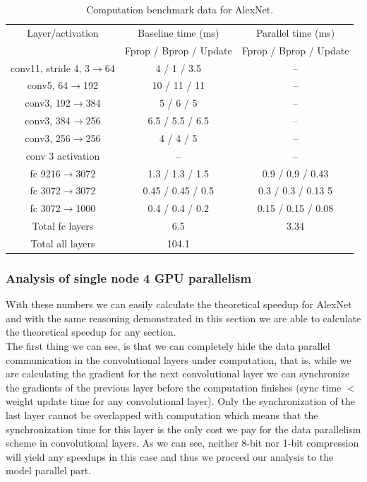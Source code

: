 \documentclass{article} %
\begin{document}
\begin{table}[h]
	\caption{Computation benchmark data for AlexNet. }
	\label{sample-table}
	\begin{minipage}
		{\linewidth}
		\centering
		\begin{tabular}{ ccc}
			\toprule[1.5pt]
			Layer/activation & Baseline time (ms) & Parallel time (ms)   \\
			& Fprop / Bprop / Update &  Fprop / Bprop / Update \\
			\midrule
			conv11, stride 4, 3$\rightarrow$64 & 4 / 1 / 3.5 & --   \\
			conv5, 64$\rightarrow$192 & 10 / 11 / 11 &  --  \\
			conv3, 192$\rightarrow$384 & 5 / 6 / 5 & -- \\
			conv3, 384$\rightarrow$256 & 6.5 / 5.5 / 6.5 &  -- \\
			conv3, 256$\rightarrow$256 & 4 / 4 / 5 &  -- \\\midrule
			conv 3 activation & -- & --  \\
			fc 9216$\rightarrow$3072 & 1.3 / 1.3 / 1.5 & 0.9 / 0.9 / 0.43 \\
			fc 3072$\rightarrow$3072 & 0.45 / 0.45 / 0.5 & 0.3 / 0.3 / 0.13  5\\
			fc 3072$\rightarrow$1000 & 0.4 / 0.4 / 0.2 & 0.15 / 0.15 / 0.08 \\\midrule
			Total fc layers &  6.5 & 3.34  \\
			Total all layers &  104.1 \\
			
			\bottomrule[1.25pt]
		\end{tabular}
		\par
		\bigskip
	\end{minipage}
\end{table}


\subsubsection{Analysis of single node 4 GPU parallelism}

With these numbers we can easily calculate the theoretical speedup for AlexNet and with the same reasoning demonstrated in this section we are able to calculate the theoretical speedup for any section.\\
The first thing we can see, is that we can completely hide the data parallel communication in the convolutional layers under computation, that is, while we are calculating the gradient for the next convolutional layer we can synchronize the gradients of the previous layer before the computation finishes (sync time $<$ weight update time for any convolutional layer). Only the synchronization of the last layer cannot be overlapped with computation which means that the synchronization time for this layer is the only cost we pay for the data parallelism scheme in convolutional layers. As we can see, neither 8-bit nor 1-bit compression will yield any speedups in this case and thus we proceed our analysis to the model parallel part.\\
\end{document}
